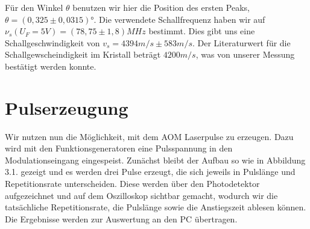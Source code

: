 \documentclass[bigchapter,colorback,accentcolor=tud4b,linedtoc,11pt]{tudreport}
\begin{document}
Für den Winkel $\theta$ benutzen wir hier die Position des ersten Peaks, $\theta = (0,325 \pm 0,0315)$°. Die verwendete Schallfrequenz haben wir auf $\nu_s\left( U_F= 5V \right) = \left( 78,75 \pm 1,8 \right)MHz$ bestimmt. Dies gibt uns eine Schallgeschwindigkeit von $v_s = 4394m/s \pm 583m/s$. Der Literaturwert für die Schallgewscheindigkeit im Kristall beträgt $4200m/s$, was von unserer Messung bestätigt werden konnte.

\section{Pulserzeugung}

Wir nutzen nun die Möglichkeit, mit dem AOM Laserpulse zu erzeugen. Dazu wird mit den Funktionsgeneratoren eine Pulsspannung in den Modulationseingang eingespeist. Zunächst bleibt der Aufbau so wie in Abbildung 3.1. gezeigt und es werden drei Pulse erzeugt, die sich jeweils in Pulslänge und Repetitionsrate unterscheiden. Diese werden über den Photodetektor aufgezeichnet und auf dem Oszilloskop sichtbar gemacht, wodurch wir die tatsächliche Repetitionsrate, die Pulslänge sowie die Anstiegszeit ablesen können. Die Ergebnisse werden zur Auswertung an den PC übertragen.
\end{document}
